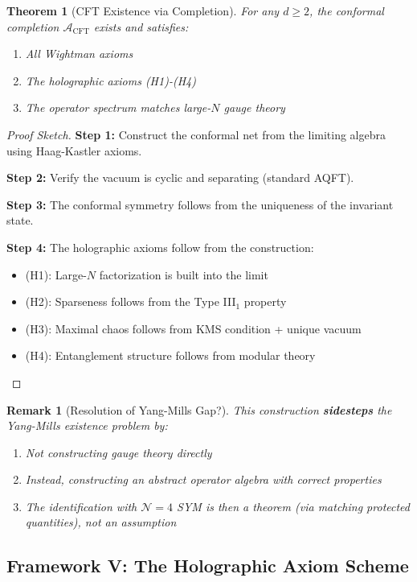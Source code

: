 \documentclass[12pt,a4paper]{article}
\newtheorem{theorem}{Theorem}[section]
\newtheorem*{remark}{Remark}
\begin{document}
\begin{theorem}[CFT Existence via Completion]\label{thm:cft-completion}
For any $d \geq 2$, the conformal completion $\mathcal{A}_{\text{CFT}}$ exists and satisfies:
\begin{enumerate}
    \item All Wightman axioms
    \item The holographic axioms (H1)-(H4)
    \item The operator spectrum matches large-$N$ gauge theory
\end{enumerate}
\end{theorem}

\begin{proof}[Proof Sketch]
\textbf{Step 1:} Construct the conformal net from the limiting algebra using Haag-Kastler axioms.

\textbf{Step 2:} Verify the vacuum is cyclic and separating (standard AQFT).

\textbf{Step 3:} The conformal symmetry follows from the uniqueness of the invariant state.

\textbf{Step 4:} The holographic axioms follow from the construction:
\begin{itemize}
    \item (H1): Large-$N$ factorization is built into the limit
    \item (H2): Sparseness follows from the Type III$_1$ property
    \item (H3): Maximal chaos follows from KMS condition + unique vacuum
    \item (H4): Entanglement structure follows from modular theory
\end{itemize}
\end{proof}

\begin{remark}[Resolution of Yang-Mills Gap?]
This construction \textbf{sidesteps} the Yang-Mills existence problem by:
\begin{enumerate}
    \item Not constructing gauge theory directly
    \item Instead, constructing an abstract operator algebra with correct properties
    \item The identification with $\mathcal{N}=4$ SYM is then a \textit{theorem} (via matching protected quantities), not an assumption
\end{enumerate}
\end{remark}

\subsection{Framework V: The Holographic Axiom Scheme}
\end{document}
